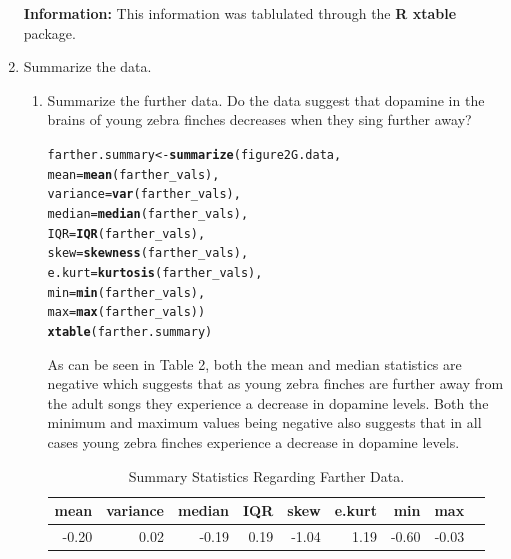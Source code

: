 \documentclass{article}\usepackage[]{graphicx}\usepackage[]{xcolor}
\makeatletter
\newcommand{\hldef}[1]{\textcolor[rgb]{0.345,0.345,0.345}{#1}}%
\newcommand{\hlkwb}[1]{\textcolor[rgb]{0.69,0.353,0.396}{#1}}%
\newcommand{\hlkwc}[1]{\textcolor[rgb]{0.333,0.667,0.333}{#1}}%
\newcommand{\hlkwd}[1]{\textcolor[rgb]{0.737,0.353,0.396}{\textbf{#1}}}%
\newenvironment{kframe}{%
 \def\at@end@of@kframe{}%
 \ifinner\ifhmode%
  \def\at@end@of@kframe{\end{minipage}}%
  \begin{minipage}{\columnwidth}%
 \fi\fi%
 \def\FrameCommand##1{\hskip\@totalleftmargin \hskip-\fboxsep
 \colorbox{shadecolor}{##1}\hskip-\fboxsep
     \hskip-\linewidth \hskip-\@totalleftmargin \hskip\columnwidth}%
 \MakeFramed {\advance\hsize-\width
   \@totalleftmargin\z@ \linewidth\hsize
   \@setminipage}}%
 {\par\unskip\endMakeFramed%
 \at@end@of@kframe}
\newenvironment{knitrout}{}{} %
\makeatother
\begin{document}
\begin{enumerate}
\textbf{Information:} This information was tablulated through the \textbf{R xtable} package.
\newpage

\item Summarize the data.
\begin{enumerate}
  \item Summarize the further data. Do the data suggest that
   dopamine in the brains of young zebra finches decreases when
   they sing further away?
\begin{knitrout}
\color{fgcolor}\begin{kframe}
\begin{alltt}
\hldef{farther.summary} \hlkwb{<-} \hlkwd{summarize}\hldef{(figure2G.data,}
                            \hlkwc{mean} \hldef{=} \hlkwd{mean}\hldef{(farther_vals),}
                            \hlkwc{variance} \hldef{=} \hlkwd{var}\hldef{(farther_vals),}
                            \hlkwc{median} \hldef{=} \hlkwd{median}\hldef{(farther_vals),}
                            \hlkwc{IQR} \hldef{=} \hlkwd{IQR}\hldef{(farther_vals),}
                            \hlkwc{skew} \hldef{=} \hlkwd{skewness}\hldef{(farther_vals),}
                            \hlkwc{e.kurt} \hldef{=} \hlkwd{kurtosis}\hldef{(farther_vals),}
                            \hlkwc{min} \hldef{=} \hlkwd{min}\hldef{(farther_vals),}
                            \hlkwc{max} \hldef{=} \hlkwd{max}\hldef{(farther_vals))}
\hlkwd{xtable}\hldef{(farther.summary)}
\end{alltt}
\end{kframe}
\end{knitrout}

As can be seen in Table 2, both the mean and median statistics are negative which suggests that as young zebra finches are further away from the adult songs they experience a decrease in dopamine levels. Both the minimum and maximum values being negative also suggests that in all cases young zebra finches experience a decrease in dopamine levels.

\begin{table}[ht]
\centering
\begin{tabular}{rrrrrrrrr}
  \hline
mean & variance & median & IQR & skew & e.kurt & min & max \\ 
  \hline
-0.20 & 0.02 & -0.19 & 0.19 & -1.04 & 1.19 & -0.60 & -0.03 \\ 
   \hline
\end{tabular}
\caption{Summary Statistics Regarding Farther Data.}
\label{table2}
\end{table}


\end{enumerate}
\end{enumerate}
\end{document}

